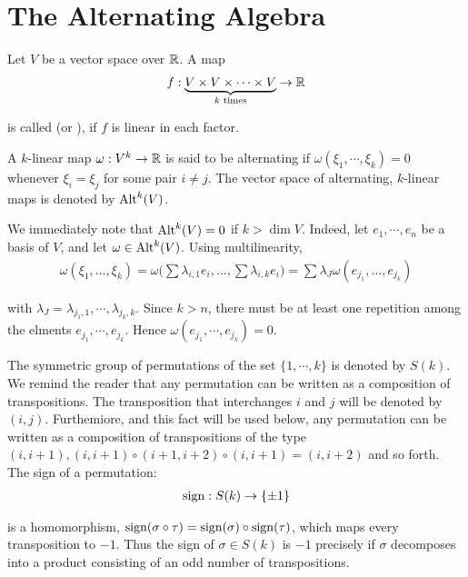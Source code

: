 \chapter{The Alternating Algebra}
Let $V$ be a vector space over $\mathbb{R}$. A map
\begin{align*}
  f: \underbrace{V\times V\times \cdots \times V}_{k\text{ times}} \to \mathbb{R}
\end{align*}

is called  (or ), if $f$ is linear in each factor.


\begin{definition}
  A $k$-linear map $\omega: V^k\to\mathbb{R}$ is said to be alternating if
  $\omega(\xi_1, \cdots, \xi_k) = 0$ whenever $\xi_i=\xi_j$ for some pair $i\neq j$. The vector space
  of alternating, $k$-linear maps is denoted by $\operatorname{Alt}^k(V)$.
\end{definition}


We immediately note that $\operatorname{Alt}^k(V) = 0$ if $k > \dim V$. Indeed, let $e_1, \cdots, e_n$ be a
basis of $V$, and let $\omega\in\operatorname{Alt}^k(V)$. Using multilinearity,
\begin{align*}
  \omega(\xi_{1},\ldots,\xi_{k})=\omega\Big(\sum\lambda_{i,1}e_{i},\ldots,\sum\lambda_{i,k}e_{i}\Big)=\sum\lambda_{J}\omega(e_{j_{1}},\ldots,e_{j_{k}})
\end{align*}


with $\lambda_J = \lambda_{j_1, 1}, \cdots, \lambda_{j_k, k}$. Since $k>n$, there must be at least one repetition
among the elments $e_{j_1}, \cdots, e_{j_k}$. Hence $\omega(e_{j_1}, \cdots, e_{j_k}) = 0$.

The symmetric group of permutations of the set $\{1, \cdots,k\}$ is denoted by $S(k)$.
We remind the reader that any permutation can be written as a composition of
transpositions. The transposition that interchanges $i$ and $j$ will be denoted by $(i, j)$.
Furthemiore, and this fact will be used below, any permutation can be written as a
composition of transpositions of the type $(i, i+1), (i, i+1)\circ(i+1, i+2)\circ(i, i+1) =
  (i, i + 2)$ and so forth. The sign of a permutation:
\begin{align}\label{eq:2-1}
  \operatorname{sign}: S(k) \to \{\pm 1\}
\end{align}


is a homomorphism, $\operatorname{sign}(\sigma\circ\tau) = \operatorname{sign}(\sigma)\circ\operatorname{sign}(\tau)$, which maps every
transposition to $-1$. Thus the sign of $\sigma\in S(k)$ is $-1$ precisely if $\sigma$ decomposes into a
product consisting of an odd number of transpositions.

